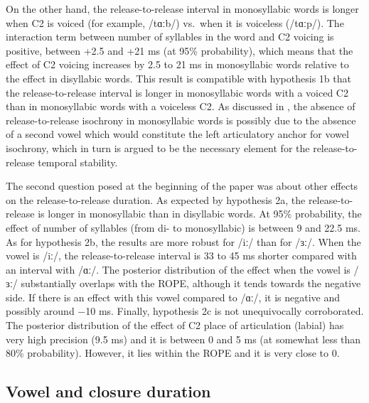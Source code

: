 \documentclass[
  12pt,
  a4paper,
]{article}
\begin{document}
On the other hand, the release-to-release interval in monosyllabic words
is longer when C2 is voiced (for example, /tɑːb/) vs.~when it is
voiceless (/tɑːp/). The interaction term between number of syllables in
the word and C2 voicing is positive, between +2.5 and +21 ms (at 95\%
probability), which means that the effect of C2 voicing increases by 2.5
to 21 ms in monosyllabic words relative to the effect in disyllabic
words. This result is compatible with hypothesis 1b that the
release-to-release interval is longer in monosyllabic words with a
voiced C2 than in monosyllabic words with a voiceless C2. As discussed
in , the absence of release-to-release isochrony in
monosyllabic words is possibly due to the absence of a second vowel
which would constitute the left articulatory anchor for vowel isochrony,
which in turn is argued to be the necessary element for the
release-to-release temporal stability.

The second question posed at the beginning of the paper was about other
effects on the release-to-release duration. As expected by hypothesis
2a, the release-to-release is longer in monosyllabic than in disyllabic
words. At 95\% probability, the effect of number of syllables (from di-
to monosyllabic) is between 9 and 22.5 ms. As for hypothesis 2b, the
results are more robust for /iː/ than for /ɜː/. When the vowel is /iː/,
the release-to-release interval is 33 to 45 ms shorter compared with an
interval with /ɑː/. The posterior distribution of the effect when the
vowel is /ɜː/ substantially overlaps with the ROPE, although it tends
towards the negative side. If there is an effect with this vowel
compared to /ɑː/, it is negative and possibly around −10 ms. Finally,
hypothesis 2c is not unequivocally corroborated. The posterior
distribution of the effect of C2 place of articulation (labial) has very
high precision (9.5 ms) and it is between 0 and 5 ms (at somewhat less
than 80\% probability). However, it lies within the ROPE and it is very
close to 0.

\hypertarget{vowel-and-closure-duration}{%
\subsection{Vowel and closure
duration}\label{vowel-and-closure-duration}}

\label{s:vc-disc}
\end{document}
